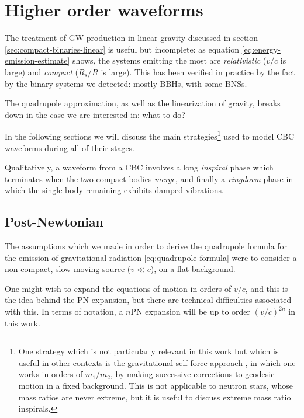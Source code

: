 \documentclass[main.tex]{subfiles}
\begin{document}
\section{Higher order waveforms}

The treatment of \ac{GW} production in linear gravity discussed in section \ref{sec:compact-binaries-linear} is useful but incomplete: as equation \eqref{eq:energy-emission-estimate} shows, the systems emitting the most are \emph{relativistic} (\(v/c\) is large) and \emph{compact} (\(R_s / R\) is large). 
This has been verified in practice by the fact by the binary systems we detected: mostly \acsp{BBH}, with some \acsp{BNS}.

The quadrupole approximation, as well as the linearization of gravity, breaks down in the case we are interested in: what to do? 

In the following sections we will discuss the main strategies\footnote{One strategy which is not particularly relevant in this work but which is useful in other contexts is the gravitational self-force approach \cite{waldIntroductionGravitationalSelfForce2009}, in which one works in orders of \(m_1 / m_2\), by making successive corrections to geodesic motion in a fixed background. This is not applicable to neutron stars, whose mass ratios are never extreme, but it is useful to discuss extreme mass ratio inspirals.} used to model \ac{CBC} waveforms during all of their stages. 

Qualitatively, a waveform from a \ac{CBC} involves a long \emph{inspiral} phase which terminates when the two compact bodies \emph{merge}, and finally a \emph{ringdown} phase in which the single body remaining exhibits damped vibrations.

\subsection{Post-Newtonian} \label{sec:post-newtonian}

The assumptions which we made in order to derive the quadrupole formula for the emission of gravitational radiation \eqref{eq:quadrupole-formula} were to consider a non-compact, slow-moving source (\(v \ll c\)), on a flat background. 

One might wish to expand the equations of motion in orders of \(v / c\), and this is the idea behind the \ac{PN} expansion, but there are technical difficulties associated with this. 
In terms of notation, a \(n\)PN expansion will be up to order \((v/c)^{2n}\) in this work.
\end{document}
